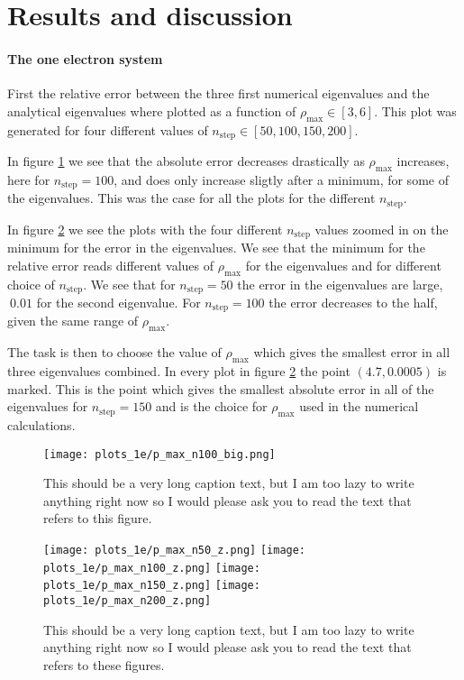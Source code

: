 \documentclass[11pt,a4wide]{article}
\begin{document}
\newpage
\part{Results and discussion}
\subsection*{The one electron system }
First the relative error between the three first numerical eigenvalues and the analytical eigenvalues where plotted as a function of $\rho_{\mathrm{max}} \in [3,6]$. This plot was generated for four different values of $n_{\mathrm{step}} \in [50, 100, 150, 200]$. 

In figure \ref{fig: p_max_big} we see that the absolute error decreases drastically as  $\rho_{\mathrm{max}}$ increases, here for $n_{\mathrm{step}}=100$, and does only increase sligtly after a minimum, for some of the eigenvalues. This was the case for all the plots for the different $n_{\mathrm{step}}$.

In figure \ref{fig: p_max_zoom} we see the plots with the four different $n_{\mathrm{step}}$ values zoomed in on the minimum for the error in the eigenvalues. We see that the minimum for the relative error reads different values of $\rho_{\mathrm{max}}$ for the eigenvalues and for different choice of $n_{\mathrm{step}}$. We see that for $n_{\mathrm{step}}=50$ the error in the eigenvalues are  large, $~0.01$ for the second eigenvalue. For $n_{\mathrm{step}}=100$ the error decreases to the half, given the same range of $\rho_{\mathrm{max}}$. 

The task is then to choose the value of $\rho_{\mathrm{max}}$ which gives the smallest error in all three eigenvalues combined. In every plot in figure \ref{fig: p_max_zoom} the point $(4.7, 0.0005)$ is marked. This is the point which gives the smallest absolute error in all of the eigenvalues for $n_{\mathrm{step}}=150$ and is the choice for $\rho_{\mathrm{max}}$ used in the numerical calculations. 

\begin{figure} [ht]
\centering
\texttt{[image: plots\_1e/p\_max\_n100\_big.png]}
\caption{This should be a very long caption text, but I am too lazy to write anything right now so I would please ask you to read the text that refers to this figure.}
\label{fig: p_max_big}
\end{figure}

\begin{figure} [htp]
\centering
		\texttt{[image: plots\_1e/p\_max\_n50\_z.png]}
		\texttt{[image: plots\_1e/p\_max\_n100\_z.png]}
		\texttt{[image: plots\_1e/p\_max\_n150\_z.png]}
		\texttt{[image: plots\_1e/p\_max\_n200\_z.png]}
\caption{This should be a very long caption text, but I am too lazy to write anything right now so I would please ask you to read the text that refers to these figures.}
\label{fig: p_max_zoom}
\end{figure}
\end{document}
